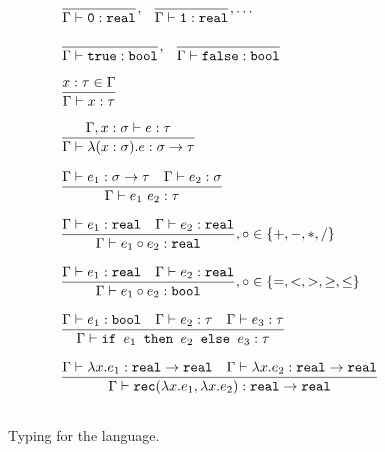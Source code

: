 \begin{figure}
\[
\begin{array}{lr}
\dfrac{}{\Gamma \vdash \texttt{0}: \texttt{real}}, \ \ \dfrac{}{\Gamma \vdash \texttt{1}: \texttt{real}}, \ldots \\ \\
\dfrac{}{\Gamma \vdash \texttt{true} : \texttt{bool}}, \ \ \dfrac{}{\Gamma \vdash \texttt{false} : \texttt{bool}} \\  \\
\dfrac{x : \tau \in \Gamma}{\Gamma \vdash x : \tau } \\ \\ 
\dfrac{\Gamma, x : \sigma \vdash e : \tau}{\Gamma \vdash \lambda (x : \sigma).e : \sigma \rightarrow \tau } \\ \\
\dfrac{\Gamma \vdash e_1: \sigma \rightarrow \tau \ \ \ \Gamma \vdash e_2 : \sigma}{\Gamma \vdash e_1 \ e_2 : \tau} \\ \\
\dfrac{\Gamma \vdash e_1 : \texttt{real} \ \ \ \Gamma \vdash e_2 : \texttt{real}}{\Gamma \vdash e_1 \circ e_2 : \texttt{real}}
, \circ \in \{+,-,*,/\} \\ \\ 
\dfrac{\Gamma \vdash e_1 : \texttt{real} \ \ \ \Gamma \vdash e_2 : \texttt{real}}{\Gamma \vdash e_1 \circ e_2 : \texttt{bool}}
, \circ \in \{=, <, >, \geq, \leq\} \\ \\ 
\dfrac{\Gamma \vdash e_1 : \texttt{bool} \ \ \ \Gamma \vdash e_2 : \tau \ \ \ \Gamma \vdash e_3 : \tau}
{\Gamma \vdash \ifelse{e_1}{e_2}{e_3} : \tau} \\ \\ 
\dfrac{\Gamma \vdash \lambda x.e_1 : \texttt{real} \rightarrow \texttt{real} \ \ \ \Gamma \vdash \lambda x.e_2 : 
\texttt{real} \rightarrow \texttt{real}}
{\Gamma \vdash \texttt{rec}(\lambda x.e_1, \lambda x.e_2) : \texttt{real} \rightarrow \texttt{real}} \\ \\ 
\end{array}
\]
\caption{Typing for the language.}
\label{fig:typing}
\end{figure}

